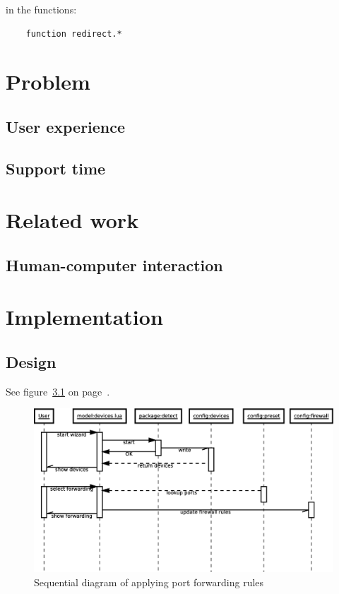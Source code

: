 \documentclass[a4paper,11pt]{kth-mag}
\begin{document}
in the functions:

\begin{verbatim}
    function redirect.*
\end{verbatim}

\chapter{Problem}
\section{User experience}

\section{Support time}

\chapter{Related work}
\section{Human-computer interaction}

\chapter{Implementation}
\section{Design}


See figure~\ref{fig:wizard-seq_dia} on page~\pageref{fig:wizard-seq_dia}.
\begin{figure}[h!]
   \centering
   \includegraphics[width=15cm]{wizard-seq_dia}
   \caption{Sequential diagram of applying port forwarding rules}
   \label{fig:wizard-seq_dia}
\end{figure}
\end{document}
